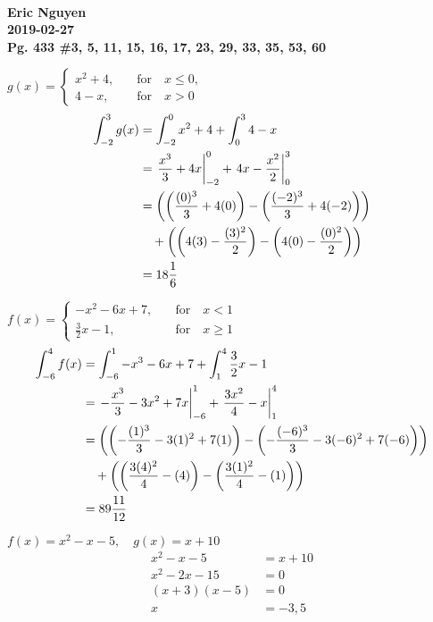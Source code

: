 \documentclass[12pt]{article}
\newenvironment{problem}[2][]{
    \begin{trivlist}
        \item[
            {\bfseries #1}
            {\bfseries #2.}
        ]
}{\end{trivlist}}
\newcommand{\assignment}{Pg. 433 \#3, 5, 11, 15, 16, 17, 23, 29, 33, 35, 53, 60}
\newcommand{\name}{Eric Nguyen}
\newcommand{\duedate}{2019-02-27}
\newcommand{\details}{\textbf{\\\name \\\duedate \\\assignment}}
\newcommand{\plugin}[2]{\left(\left({#1}\right) - \left({#2}\right)\right)}
\newcommand{\defint}[3]{\int_{#1}^{#2} #3}
\newcommand{\inteval}[3]{\left.#3\right|_{#1}^{#2}}
\begin{document}
\details

\begin{problem}{3}
$
g(x) = \begin{cases} 
x^2 + 4, &\quad \text{for} \quad x \leq 0, \\
4 - x, &\quad \text{for} \quad x > 0
\end{cases}
$
\begin{align}
\defint{-2}{3}{g(x)} &= \defint{-2}{0}{x^2 + 4} + \defint{0}{3}{4 - x} \\
&= \inteval{-2}{0}{\frac{x^3}{3} + 4x} + \inteval{0}{3}{4x - \frac{x^2}{2}} \\
&= \plugin{\frac{(0)^3}{3} + 4(0)}{\frac{(-2)^3}{3} + 4(-2)} \notag \\
&\quad + \plugin{4(3) - \frac{(3)^2}{2}}{4(0) - \frac{(0)^2}{2}} \\
&= 18 \frac{1}{6}
\end{align}
\end{problem}

\begin{problem}{5}
$
f(x) = \begin{cases}
-x^2 - 6x + 7, &\quad \text{for} \quad x < 1 \\
\frac{3}{2}x - 1, &\quad \text{for} \quad x \geq 1
\end{cases}
$
\begin{align}
\defint{-6}{4}{f(x)} &= \defint{-6}{1}{-x^3 - 6x + 7} + \defint{1}{4}{\frac{3}{2}x - 1} \\
&= \inteval{-6}{1}{-\frac{x^3}{3} - 3x^2 + 7x} + \inteval{1}{4}{\frac{3x^2}{4} - x} \\
&= \plugin{-\frac{(1)^3}{3} - 3(1)^2 + 7(1)}{-\frac{(-6)^3}{3} - 3(-6)^2 + 7(-6)} \notag \\
&\quad + \plugin{\frac{3(4)^2}{4} - (4)}{\frac{3(1)^2}{4} - (1)} \\
&= 89 \frac{11}{12}
\end{align}
\end{problem}

\begin{problem}{11}
$f(x) = x^2 - x - 5, \quad g(x) = x + 10$
\begin{align}
x^2 - x - 5 &= x + 10 \\
x^2 - 2x - 15 &= 0 \\
(x + 3)(x - 5) &= 0 \\
x &= -3, 5
\end{align}
\end{problem}
\end{document}
